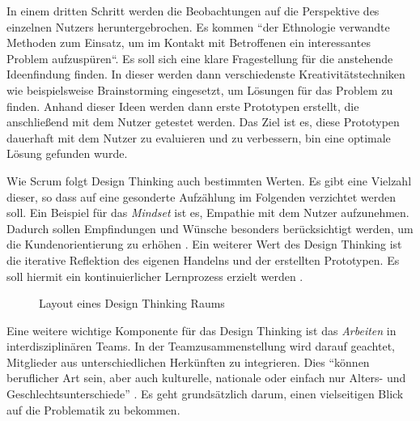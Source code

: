 In einem dritten Schritt werden die Beobachtungen auf die Perspektive des einzelnen Nutzers heruntergebrochen. Es kommen ``der Ethnologie verwandte Methoden zum Einsatz, um im Kontakt mit Betroffenen ein interessantes Problem aufzuspüren``\cite[S. 3]{meinel_design_2016}. Es soll sich eine klare Fragestellung für die anstehende Ideenfindung finden. In dieser werden dann verschiedenste Kreativitätstechniken wie beispielsweise Brainstorming eingesetzt, um Lösungen für das Problem zu finden. Anhand dieser Ideen werden dann erste Prototypen erstellt, die anschließend mit dem Nutzer getestet werden. Das Ziel ist es, diese Prototypen dauerhaft mit dem Nutzer zu evaluieren und zu verbessern, bin eine optimale Lösung gefunden wurde.

Wie Scrum folgt Design Thinking auch bestimmten Werten. Es gibt eine Vielzahl dieser, so dass auf eine gesonderte Aufzählung im Folgenden verzichtet werden soll. Ein Beispiel für das \textit{Mindset} ist es, Empathie mit dem Nutzer aufzunehmen. Dadurch sollen Empfindungen und Wünsche besonders berücksichtigt werden, um die Kundenorientierung zu erhöhen \cite[S. 3]{lewrick_design_2018}. Ein weiterer Wert des Design Thinking ist die iterative Reflektion des eigenen Handelns und der erstellten Prototypen. Es soll hiermit ein kontinuierlicher Lernprozess erzielt werden \cite[S. 3]{lewrick_design_2018}. 

\begin{figure}[H]
	\centering
	\caption[Layout eines Design Thinking Raums]{Layout eines Design Thinking Raums \protect \cite[S. 4]{lewrick_design_2018}}
	\label{fig:designthinkingroom}
\end{figure}

Eine weitere wichtige Komponente für das Design Thinking ist das \textit{Arbeiten} in interdisziplinären Teams. In der Teamzusammenstellung wird darauf geachtet, Mitglieder aus unterschiedlichen Herkünften zu integrieren. Dies ``können beruflicher Art sein, aber auch kulturelle, nationale oder einfach nur Alters- und Geschlechtsunterschiede'' \cite[S. 3]{lewrick_design_2018}. Es geht grundsätzlich darum, einen vielseitigen Blick auf die Problematik zu bekommen.

